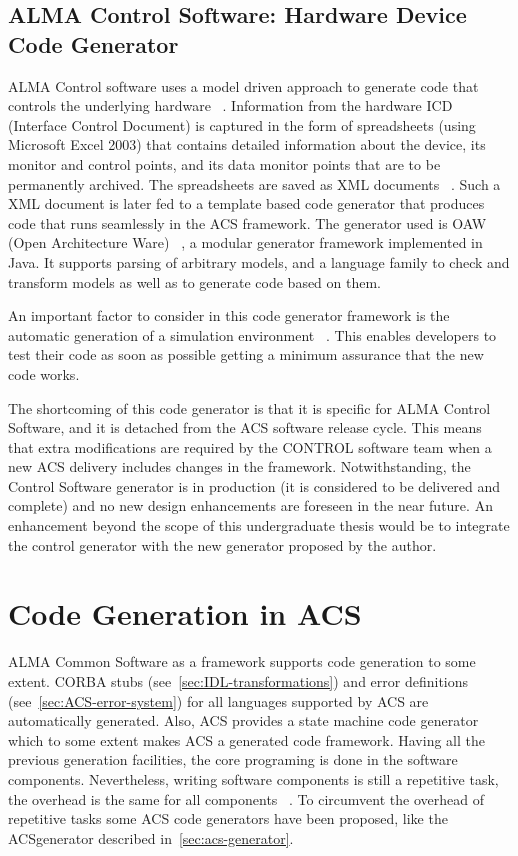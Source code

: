 \subsection{ALMA Control Software: Hardware Device Code Generator}
\label{sec:control-generator}
ALMA Control software uses a model driven approach
to generate code that controls the underlying hardware~%
  \cite{farris06:_generating_software_modules}.
Information from the hardware ICD (Interface Control Document)
is captured in the form of spreadsheets (using Microsoft Excel 2003)
that contains detailed information about the device,
its monitor and control points,
and its data monitor points that are to be permanently archived.
The spreadsheets are saved as XML documents~%
  \cite{farris07:_device_driver_code_gener_framew}.
Such a XML document is later fed to a template based code generator
that produces code that runs seamlessly in the ACS framework.
The generator used is OAW (Open Architecture Ware)~%
  \cite{OAW-WEB}, a modular generator framework implemented in Java.
It supports parsing of arbitrary models,
and a language family to check and transform models
as well as to generate code based on them.

An important factor to consider in this code generator framework
is the automatic generation of a simulation environment~%
  \cite{mora08:_towar_gener_hardw_devic_simul}.
This enables developers to test their code as soon as possible
getting a minimum assurance that the new code works.

The shortcoming of this code generator
is that it is specific for ALMA Control Software,
and it is detached from the ACS software release cycle.
This means that extra modifications are required by the CONTROL
software team when a new ACS delivery includes changes in the framework.
Notwithstanding, the Control Software generator is in production
(it is considered to be delivered and complete)
and no new design enhancements are foreseen in the near future.
An enhancement beyond the scope of this undergraduate thesis
would be to integrate the control generator with the new
generator proposed by the author.

\section{Code Generation in ACS}
\label{sec:code-generation:ACS}
ALMA Common Software as a framework supports code generation to some extent.
CORBA stubs (see~\ref{sec:IDL-transformations})
and error definitions (see~\ref{sec:ACS-error-system})
for all languages supported by ACS are automatically generated.
Also,
ACS provides a state machine code generator
which to some extent makes ACS a generated code framework.
Having all the previous generation facilities,
the core programing is done in the software components.
Nevertheless,
writing software components is still a repetitive task,
the overhead is the same for all components~%
  \cite{grega05:_acs_comp_cont_fram_tut}.
To circumvent the overhead of repetitive tasks some
ACS code generators have been proposed, like
the ACSgenerator described in~\ref{sec:acs-generator}.

